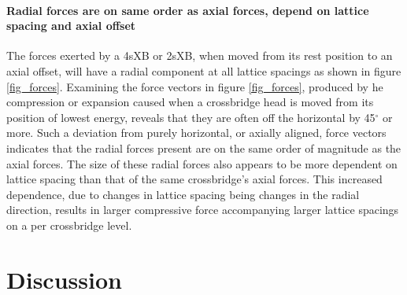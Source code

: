 \documentclass[]{article}
\begin{document}
\paragraph{Radial forces are on same order as axial forces, depend on lattice spacing and axial offset} %
The forces exerted by a 4sXB or 2sXB, when moved from its rest position to an axial offset, will have a radial component at all lattice spacings as shown in figure \ref{fig_forces}. 
Examining the force vectors in figure \ref{fig_forces}, produced by he compression or expansion caused when a crossbridge head is moved from its position of lowest energy, reveals that they are often off the horizontal by 45$^\circ$ or more. 
Such a deviation from purely horizontal, or axially aligned, force vectors indicates that the radial forces present are on the same order of magnitude as the axial forces. 
The size of these radial forces also appears to be more dependent on lattice spacing than that of the same crossbridge's axial forces. 
This increased dependence, due to changes in lattice spacing being changes in the radial direction, results in larger compressive force accompanying larger lattice spacings on a per crossbridge level. 



\section{Discussion} %



\end{document}
